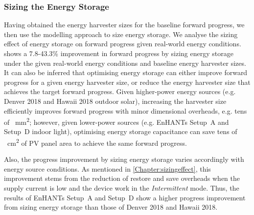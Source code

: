 \subsubsection{Sizing the Energy Storage}

Having obtained the energy harvester sizes for the baseline forward progress, we then use the modelling approach to size energy storage.
We analyse the sizing effect of energy storage on forward progress given real-world energy conditions.  shows a 7.8-43.3\% improvement in forward progress by sizing energy storage under the given real-world energy conditions and baseline energy harvester sizes. 
It can also be inferred that optimising energy storage can either improve forward progress for a given energy harvester size, or reduce the energy harvester size that achieves the target forward progress. 
Given higher-power energy sources (e.g. Denver 2018 and Hawaii 2018 outdoor solar), increasing the harvester size efficiently improves forward progress with minor dimensional overheads, e.g. tens of \SI{}{\square\milli\meter}; however, given lower-power sources (e.g. EnHANTs Setup~A and Setup~D indoor light), optimising energy storage capacitance can save tens of \SI{}{\square\centi\meter} of PV panel area to achieve the same forward progress.

Also, the progress improvement by sizing energy storage varies accordingly with energy source conditions. 
As mentioned in \cref{Chapter:sizingeffect}, this improvement stems from the reduction of restore and save overheads when the supply current is low and the device work in the \textit{Intermittent} mode. 
Thus, the results of EnHANTs Setup~A and Setup~D show a higher progress improvement from sizing energy storage than those of Denver 2018 and Hawaii 2018. 

